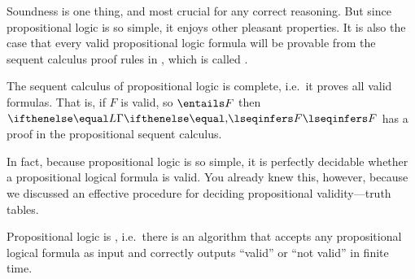 \documentclass[11pt,twoside]{scrartcl}
\newcommand{\asfml}{F}
\begin{document}
Soundness is one thing, and most crucial for any correct reasoning.
But since propositional logic is so simple, it enjoys other pleasant properties.
It is also the case that every valid propositional logic formula will be provable from the sequent calculus proof rules in , which is called .

\begin{theorem}
  The sequent calculus of propositional logic is complete, i.e.\ it proves all valid formulas.
  That is, if $\asfml$ is valid, so \(\entails \asfml\) then \(\lsequent{}{\asfml}\) has a proof in the propositional sequent calculus.
\end{theorem}

In fact, because propositional logic is so simple, it is perfectly decidable whether a propositional logical formula is valid. You already knew this, however, because we discussed an effective procedure for deciding propositional validity---truth tables.

\begin{theorem}
  Propositional logic is , i.e.\ there is an algorithm that accepts any propositional logical formula as input and correctly outputs ``valid'' or ``not valid'' in finite time.
\end{theorem}



% 

\end{document}
